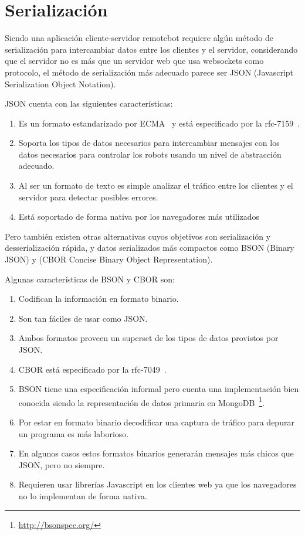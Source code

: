 
\chapter{Serialización}
\label{ch:serializacion}

Siendo una aplicación cliente-servidor remotebot requiere algún método de
serialización para intercambiar datos entre los clientes y el servidor,
considerando que el servidor no es más que un servidor web que usa websockets
como protocolo, el método de serialización más adecuado parece ser JSON
(Javascript Serialization Object Notation).

JSON cuenta con las siguientes características:

\begin{enumerate}
    \item Es un formato estandarizado por ECMA~\citep{ecma-404}
        y está especificado por la rfc-7159~\citep{rfc-7159}.
    \item Soporta los tipos de datos necesarios para intercambiar mensajes con
        los datos necesarios para controlar los robots usando un nivel de
        abstracción adecuado.
    \item Al ser un formato de texto es simple analizar el tráfico entre los
        clientes y el servidor para detectar posibles errores.
    \item Está soportado de forma nativa por los navegadores más
        utilizados%
\end{enumerate}

Pero también existen otras alternativas cuyos objetivos son serialización
y desserialización rápida, y datos serializados más compactos
como BSON (Binary JSON) y (CBOR Concise Binary Object Representation).

Algunas características de BSON y CBOR son:

\begin{enumerate}
    \item Codifican la información en formato binario.
    \item Son tan fáciles de usar como JSON.
    \item Ambos formatos proveen un superset de los tipos de datos provistos
        por JSON.
    \item CBOR está especificado por la rfc-7049~\citep{rfc-7049}.
    \item BSON tiene una especificación informal pero cuenta una
        implementación bien conocida siendo la representación de datos primaria en
        MongoDB~\footnote{\url{http://bsonspec.org/}}.
    \item Por estar en formato binario decodificar una captura de tráfico
        para depurar un programa es más laborioso.
    \item En algunos casos estos formatos binarios generarán mensajes más
        chicos que JSON, pero no siempre.
    \item Requieren usar librerías Javascript en los clientes web ya que los
        navegadores no lo implementan de forma nativa.
\end{enumerate}

